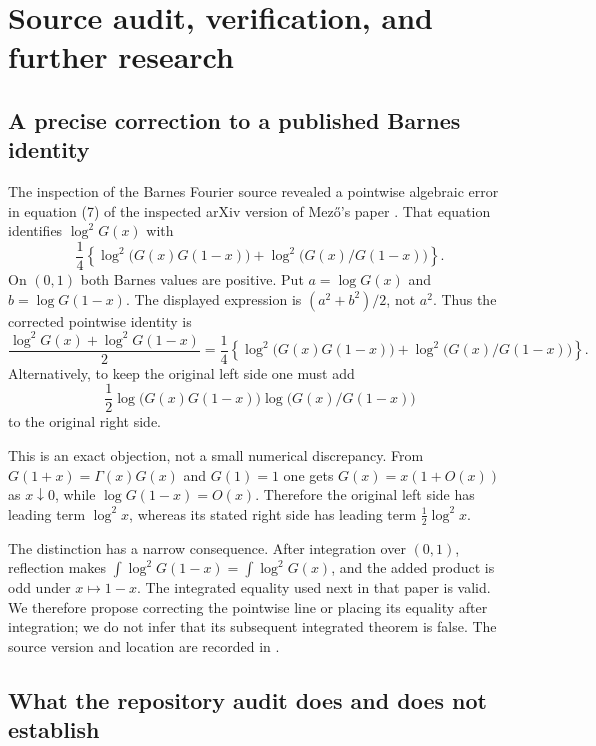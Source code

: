 \section{Source audit, verification, and further research}
\label{bhr:sec:audit}

\subsection{A precise correction to a published Barnes identity}

The inspection of the Barnes Fourier source revealed a pointwise
algebraic error in equation (7) of the inspected arXiv version of
Mez\H{o}'s paper \cite{bhr:Mezo}. That equation identifies
$\log^2G(x)$ with
\[
 \frac14\left\{
   \log^2\bigl(G(x)G(1-x)\bigr)
   +\log^2\bigl(G(x)/G(1-x)\bigr)\right\}.
\]
On $(0,1)$ both Barnes values are positive. Put
$a=\log G(x)$ and $b=\log G(1-x)$. The displayed expression
is $(a^2+b^2)/2$, not $a^2$. Thus the corrected pointwise identity is
\begin{equation}\label{bhr:eq:Mezo-correction}
 \boxed{\displaystyle
 \frac{\log^2G(x)+\log^2G(1-x)}2
 =\frac14\left\{
   \log^2\bigl(G(x)G(1-x)\bigr)
   +\log^2\bigl(G(x)/G(1-x)\bigr)\right\}.}
\end{equation}
Alternatively, to keep the original left side one must add
\[
 \frac12\log\bigl(G(x)G(1-x)\bigr)
           \log\bigl(G(x)/G(1-x)\bigr)
\]
to the original right side.

This is an exact objection, not a small numerical discrepancy.
From $G(1+x)=\Gamma(x)G(x)$ and $G(1)=1$ one gets
$G(x)=x(1+O(x))$ as $x\downarrow0$, while
$\log G(1-x)=O(x)$. Therefore the original left side has leading
term $\log^2x$, whereas its stated right side has leading term
$\tfrac12\log^2x$.

The distinction has a narrow consequence. After integration over
$(0,1)$, reflection makes
$\int\log^2G(1-x)=\int\log^2G(x)$, and the added product
is odd under $x\mapsto1-x$. The integrated equality used next in
that paper is valid. We therefore propose correcting the pointwise
line or placing its equality after integration; we do not infer
that its subsequent integrated theorem is false. The source version
and location are recorded in .

\subsection{What the repository audit does and does not establish}

